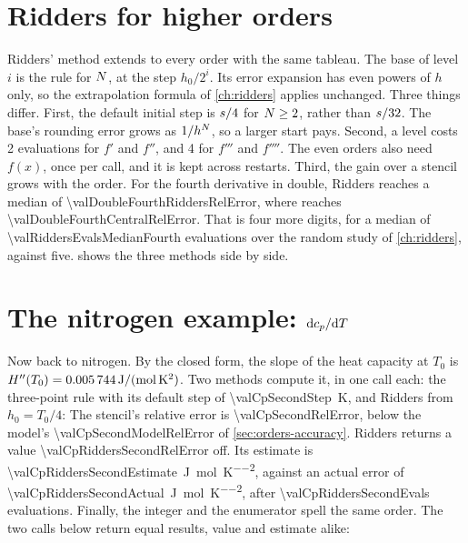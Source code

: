 \section{Ridders for higher orders}\label{sec:orders-ridders}

Ridders' method extends to every order with the same tableau. The base of level $i$ is the  rule for $N$, at the step
$h_0 / 2^i$. Its error expansion has even powers of $h$ only, so the extrapolation formula of \cref{ch:ridders}
applies unchanged. Three things differ. First, the default initial step is $s / 4$ for $N \ge 2$, rather
than $s / 32$. The base's rounding error grows as $1/h^{N}$, so a larger start pays. Second, a level costs
2 evaluations for $f'$ and $f''$, and 4 for $f'''$ and $f''''$. The even orders also need $f(x)$, once per call, and
it is kept across restarts. Third, the gain over a stencil grows with the order. For the fourth derivative in double,
Ridders reaches a median of \num{\valDoubleFourthRiddersRelError}, where  reaches
\num{\valDoubleFourthCentralRelError}. That is four more digits, for a median of \num{\valRiddersEvalsMedianFourth}
evaluations over the random study of \cref{ch:ridders}, against five.  shows the three
methods side by side.

\section{The nitrogen example: $\mathrm{d} c_p / \mathrm{d} T$}\label{sec:orders-thread}

Now back to nitrogen. By the closed form, the slope of the heat capacity at $T_0$ is
$H''(T_0) = \SI{0.005744}{\joule\per\mole\per\kelvin\squared}$. Two methods compute it, in one call
each: the three-point rule with its default step of \SI{\valCpSecondStep}{\kelvin}, and Ridders from
$h_0 = T_0 / 4$:
The stencil's relative error is \num{\valCpSecondRelError}, below the model's \num{\valCpSecondModelRelError} of
\cref{sec:orders-accuracy}. Ridders returns a value \num{\valCpRiddersSecondRelError} off. Its estimate is
\SI{\valCpRiddersSecondEstimate}{\joule\per\mole\per\kelvin\squared}, against an actual error of
\SI{\valCpRiddersSecondActual}{\joule\per\mole\per\kelvin\squared}, after \num{\valCpRiddersSecondEvals}
evaluations. Finally, the integer and the enumerator spell the same order. The two calls below return equal results,
value and estimate alike:

